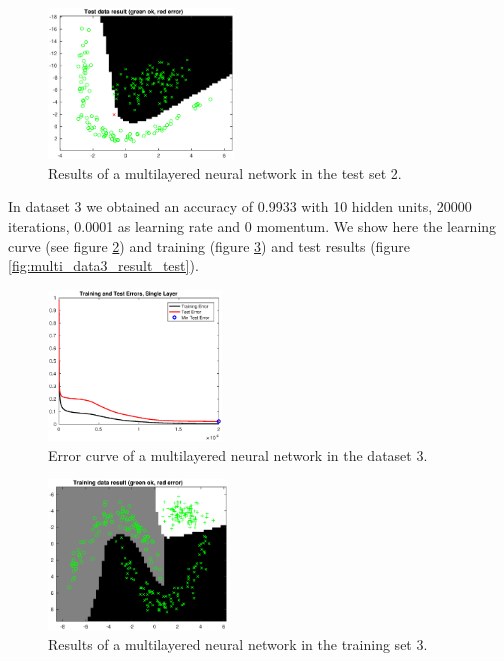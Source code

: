 \documentclass{article}
\begin{document}
\begin{figure}[H]
\centering
\includegraphics[height=4cm]{images/multi_data2_result_test}
\caption{Results of a multilayered neural network in the test set 2.}
\label{fig:multi_data2_result_test}
\end{figure}


In dataset 3 we obtained an accuracy of 0.9933 with 10 hidden units, 20000 iterations, 0.0001 as learning rate and 0 momentum. We show here the learning curve (see figure \ref{fig:multi_data3_error}) and training (figure \ref{fig:multi_data3_result_train}) and test results (figure \ref{fig:multi_data3_result_test}).

\begin{figure}[H]
\centering
\includegraphics[height=4cm]{images/multi_data3_error}
\caption{Error curve of a multilayered neural network in the dataset 3.}
\label{fig:multi_data3_error}
\end{figure}

\begin{figure}[H]
\centering
\includegraphics[height=4cm]{images/multi_data3_result_train}
\caption{Results of a multilayered neural network in the training set 3.}
\label{fig:multi_data3_result_train}
\end{figure}
\end{document}
